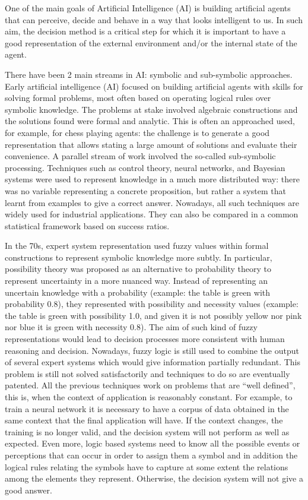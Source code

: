 \documentclass[
		twoside,openright,titlepage,numbers=noenddot,manychapters,
		headinclude,%
                footinclude=false,cleardoublepage=empty,
                BCOR=5mm,
		fontsize=11pt, %
                 enabledeprecatedfontcommands]{scrreprt}
\begin{document}
One of the main goals of Artificial Intelligence (AI) is building artificial agents that can perceive, decide and behave in a way that looks intelligent to us. In such aim, the decision method is a critical step for which it is important to have a good representation of the external environment and/or the internal state of the agent.

There have been 2 main streams in AI: symbolic and sub-symbolic approaches. Early artificial intelligence (AI) focused on building artificial agents with skills for solving formal problems, most often based on operating logical rules over symbolic knowledge. The problems at stake involved algebraic constructions and the solutions found were formal and analytic. This is often an approached used, for example, for chess playing agents: the challenge is to generate a good representation that allows stating a large amount of solutions and evaluate their convenience.
A parallel stream of work involved the so-called sub-symbolic processing. Techniques such as control theory, neural networks, and Bayesian systems were used to represent knowledge in a much more distributed way: there was no variable representing a concrete proposition, but rather a system that learnt from examples to give a correct answer. Nowadays, all such techniques are widely used for industrial applications. They can also be compared in a common statistical framework based on success ratios.

In the 70s, expert system representation used fuzzy values within formal constructions to represent symbolic knowledge more subtly. In particular, possibility theory was proposed as an alternative to probability theory to represent uncertainty in a more nuanced way. Instead of representing an uncertain knowledge with a probability (example: the table is green with probability 0.8), they represented with possibility and necessity values (example: the table is green with possibility 1.0, and given it is not possibly yellow nor pink nor blue it is green with necessity 0.8). The aim of such kind of fuzzy representations would lead to decision processes more consistent with human reasoning and decision. Nowadays, fuzzy logic is still used to combine the output of several expert systems which would give information partially redundant. This problem is still not solved satisfactorily and techniques to do so are eventually patented.
All the previous techniques work on problems that are ``well defined'', this is, when the context of application is reasonably constant. For example, to train a neural network it is necessary to have a corpus of data obtained in the same context that the final application will have. If the context changes, the training is no longer valid, and the decision system will not perform as well as expected. Even more, logic based systems need to know all the possible events or perceptions that can occur in order to assign them a symbol and in addition the logical rules relating the symbols have to capture at some extent the relations among the elements they represent. Otherwise, the decision system will not give a good answer.
\end{document}
